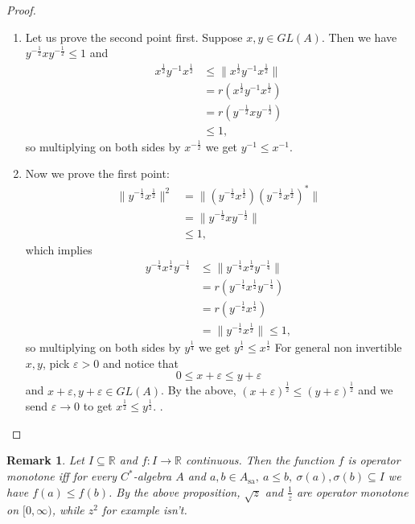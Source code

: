 \documentclass[10pt, a4paper]{article}
\newtheorem*{remark}{Remark}
\newenvironment{noticeC}{%
  \tcolorbox[%
  notitle,
  empty,
  enhanced,  %
  breakable,
  coltext=black, 
  fontupper=\rmfamily,
  noparskip,
  sharp corners,
  boxrule=-1pt,  %
  frame hidden,
  left=7pt,  %
  right=7pt,
  top=5pt,
  bottom=5pt,
  before skip=2.5ex plus 2pt,
  after skip=2.5ex plus 2pt,
  overlay unbroken and last={%
  },
  ]}
{\endtcolorbox}
\newenvironment{myproof}%
  {\begin{noticeC}\begin{proof}}%
  {\end{proof}\end{noticeC}}
\newcommand{\R}{\mathbb {R}}
\DeclareMathOperator{\sa}{sa}
\begin{document}
\begin{myproof}
  \begin{enumerate}
    \item Let us prove the second point first. Suppose $x, y \in GL(A)$.
    Then we have $y^{-\frac{1}{2}} x y^{-\frac{1}{2}} \leq 1$ and 
    \begin{align*}
      x^{\frac{1}{2}} y^{-1} x^{\frac{1}{2}} &\leq \| x^{\frac{1}{2}} y^{-1} x^{\frac{1}{2}}\|\\
      &= r(x^{\frac{1}{2}} y^{-1} x^{\frac{1}{2}})\\
      &= r(y^{-\frac{1}{2}} x y^{-\frac{1}{2}})\\
      &\leq 1,
    \end{align*}
    so multiplying on both sides by $x^{-\frac{1}{2}}$ we get $y^{-1} \leq x^{-1}$.
    \item Now we prove the first point:  
    \begin{align*}
      \|y^{-\frac{1}{2}} x^{\frac{1}{2}}\|^2 &= \|(y^{-\frac{1}{2}} x^{\frac{1}{2}}) (y^{-\frac{1}{2}} x^{\frac{1}{2}})^*\|\\
      &= \|y^{-\frac{1}{2}} x y^{-\frac{1}{2}}\|\\
      &\leq 1,
    \end{align*}
    which implies
    \begin{align*}
      y^{-\frac{1}{4}} x^{\frac{1}{2}} y^{-\frac{1}{4}} &\leq \|y^{-\frac{1}{4}} x^{\frac{1}{2}} y^{-\frac{1}{4}}\|\\
      &= r(y^{-\frac{1}{4}} x^{\frac{1}{2}} y^{-\frac{1}{4}})\\
      &= r(y^{-\frac{1}{2}} x^{\frac{1}{2}})\\
      &= \| y^{-\frac{1}{2}} x^{\frac{1}{2}} \| \leq 1, 
    \end{align*}
    so multiplying on both sides by $y^{\frac{1}{4}}$ we get $y^{\frac{1}{2}} \leq x^{\frac{1}{2}}$ 
    For general non invertible $x, y$, pick $\varepsilon > 0$ and notice that 
    $$0 \leq x + \varepsilon \leq y + \varepsilon$$ and $x + \varepsilon, y + \varepsilon \in GL(A)$.
    By the above, $(x + \varepsilon)^{\frac{1}{2}} \leq (y + \varepsilon)^{\frac{1}{2}}$ and we send $\varepsilon \to 0$
    to get $x^{\frac{1}{2}} \leq y^{\frac{1}{2}}$.
    \qedhere.
  \end{enumerate}
\end{myproof}

\begin{remark}
  Let $I \subseteq \R$ and $f: I \to \R$ continuous. Then the function $f$ is operator monotone 
  iff for every $C^*$-algebra $A$ and $a, b \in A_{\sa},\ a \leq b,\ \sigma(a), \sigma(b) \subseteq I$ we have $f(a) \leq f(b)$.
  By the above proposition, $\sqrt{z}$ and $\frac{1}{z}$ are operator monotone on $[0, \infty)$,
  while $z^2$ for example isn't.
\end{remark}
\end{document}
